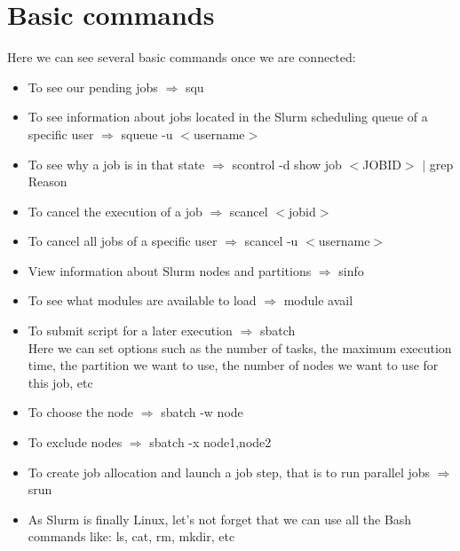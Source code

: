 \documentclass[a4paper]{article}
\begin{document}
	\section{Basic commands}
		Here we can see several basic commands once we are connected:\\
		\begin{itemize}
			\item To see our pending jobs $\Rightarrow$ squ\\
			\item To see information about jobs located in the Slurm scheduling queue of a specific user $\Rightarrow$ squeue -u $<$username$>$\\
			\item To see why a job is in that state $\Rightarrow$ scontrol -d show job $<$JOBID$>$ $|$ grep Reason\\
			\item To cancel the execution of a job $\Rightarrow$ scancel $<$jobid$>$\\
			\item To cancel all jobs of a specific user $\Rightarrow$ scancel -u $<$username$>$\\
			\item View information about Slurm nodes and partitions $\Rightarrow$ sinfo\\
			\item To see what modules are available to load $\Rightarrow$ module avail
			\item To submit script for a later execution $\Rightarrow$ sbatch\\
				Here we can set options such as the number of tasks, the maximum execution time, the partition we want to use, the number of nodes we want to use for this job, etc
			\item To choose the node $\Rightarrow$ sbatch -w node\\
			\item To exclude nodes $\Rightarrow$ sbatch -x node1,node2\\
			\item To create job allocation and launch a job step, that is to run parallel jobs $\Rightarrow$ srun
			\item As Slurm is finally Linux, let's not forget that we can use all the Bash commands like: ls, cat, rm, mkdir, etc
		\end{itemize} 				
	
\end{document}
